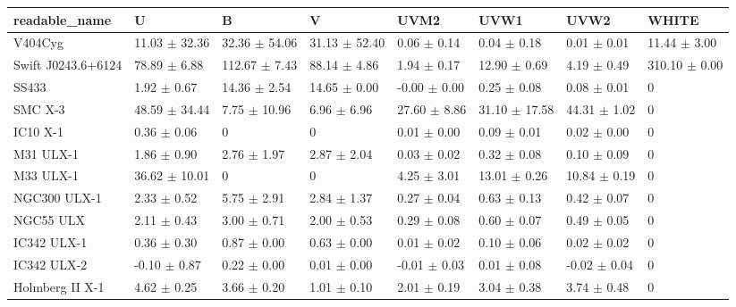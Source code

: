 \begin{tabular}{llllllll}
\toprule
     readable_name &                 U &                 B &                 V &             UVM2 &              UVW1 &             UVW2 &             WHITE \\
\midrule
           V404Cyg & 11.03 $\pm$ 32.36 & 32.36 $\pm$ 54.06 & 31.13 $\pm$ 52.40 &  0.06 $\pm$ 0.14 &   0.04 $\pm$ 0.18 &  0.01 $\pm$ 0.01 &  11.44 $\pm$ 3.00 \\
Swift J0243.6+6124 &  78.89 $\pm$ 6.88 & 112.67 $\pm$ 7.43 &  88.14 $\pm$ 4.86 &  1.94 $\pm$ 0.17 &  12.90 $\pm$ 0.69 &  4.19 $\pm$ 0.49 & 310.10 $\pm$ 0.00 \\
             SS433 &   1.92 $\pm$ 0.67 &  14.36 $\pm$ 2.54 &  14.65 $\pm$ 0.00 & -0.00 $\pm$ 0.00 &   0.25 $\pm$ 0.08 &  0.08 $\pm$ 0.01 &                 0 \\
           SMC X-3 & 48.59 $\pm$ 34.44 &  7.75 $\pm$ 10.96 &   6.96 $\pm$ 6.96 & 27.60 $\pm$ 8.86 & 31.10 $\pm$ 17.58 & 44.31 $\pm$ 1.02 &                 0 \\
          IC10 X-1 &   0.36 $\pm$ 0.06 &                 0 &                 0 &  0.01 $\pm$ 0.00 &   0.09 $\pm$ 0.01 &  0.02 $\pm$ 0.00 &                 0 \\
         M31 ULX-1 &   1.86 $\pm$ 0.90 &   2.76 $\pm$ 1.97 &   2.87 $\pm$ 2.04 &  0.03 $\pm$ 0.02 &   0.32 $\pm$ 0.08 &  0.10 $\pm$ 0.09 &                 0 \\
         M33 ULX-1 & 36.62 $\pm$ 10.01 &                 0 &                 0 &  4.25 $\pm$ 3.01 &  13.01 $\pm$ 0.26 & 10.84 $\pm$ 0.19 &                 0 \\
      NGC300 ULX-1 &   2.33 $\pm$ 0.52 &   5.75 $\pm$ 2.91 &   2.84 $\pm$ 1.37 &  0.27 $\pm$ 0.04 &   0.63 $\pm$ 0.13 &  0.42 $\pm$ 0.07 &                 0 \\
         NGC55 ULX &   2.11 $\pm$ 0.43 &   3.00 $\pm$ 0.71 &   2.00 $\pm$ 0.53 &  0.29 $\pm$ 0.08 &   0.60 $\pm$ 0.07 &  0.49 $\pm$ 0.05 &                 0 \\
       IC342 ULX-1 &   0.36 $\pm$ 0.30 &   0.87 $\pm$ 0.00 &   0.63 $\pm$ 0.00 &  0.01 $\pm$ 0.02 &   0.10 $\pm$ 0.06 &  0.02 $\pm$ 0.02 &                 0 \\
       IC342 ULX-2 &  -0.10 $\pm$ 0.87 &   0.22 $\pm$ 0.00 &   0.01 $\pm$ 0.00 & -0.01 $\pm$ 0.03 &   0.01 $\pm$ 0.08 & -0.02 $\pm$ 0.04 &                 0 \\
   Holmberg II X-1 &   4.62 $\pm$ 0.25 &   3.66 $\pm$ 0.20 &   1.01 $\pm$ 0.10 &  2.01 $\pm$ 0.19 &   3.04 $\pm$ 0.38 &  3.74 $\pm$ 0.48 &                 0 \\

\end{tabular}
